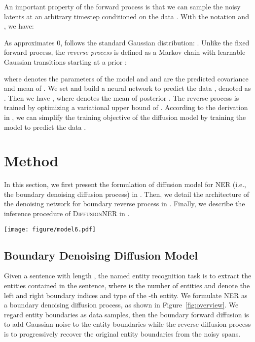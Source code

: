 \documentclass[11pt]{article}
\begin{document}
An important property of the forward process is that we can sample the noisy latents at an arbitrary timestep conditioned on the data . With the notation  and , we have:


\noindent As  approximates 0,  follows the standard Gaussian distribution: . Unlike the fixed forward process, the \textit{reverse process}  is defined as a Markov chain with learnable Gaussian transitions starting at a prior :


\noindent where  denotes the parameters of the model and  and  are the predicted covariance and mean of .
We set  and build a neural network  to predict the data , denoted as . Then we have , where  denotes the mean of posterior .
The reverse process is trained by optimizing a variational upper bound of . According to the derivation in \citet{ddpm}, we can simplify the training objective of the diffusion model by training the model  to predict the data .


\section{Method}



In this section,  we first present the formulation of diffusion model for NER (i.e., the boundary denoising diffusion process) in . Then, we detail the architecture of the denoising network for boundary reverse process in . Finally, we describe the inference procedure of \textsc{DiffusionNER} in .


\begin{figure*}
    \centering
    \texttt{[image: figure/model6.pdf]}
    \caption{Overview of \textsc{DiffusionNER}. Boundary denoising diffusion process for NER with a denoising network.}
    \label{fig:overview}
\end{figure*}





\subsection{Boundary Denoising Diffusion Model}
\label{sec:3.2}

Given a sentence  with length , the named entity recognition task is to extract the entities  contained in the sentence, where  is the number of entities and  denote the left and right boundary indices and type of the -th entity. We formulate NER as a boundary denoising diffusion process, as shown in Figure~\ref{fig:overview}.
We regard entity boundaries as data samples, then the boundary forward diffusion is to add Gaussian noise to the entity boundaries while the reverse diffusion process is to progressively recover the original entity boundaries from the noisy spans.
\end{document}
